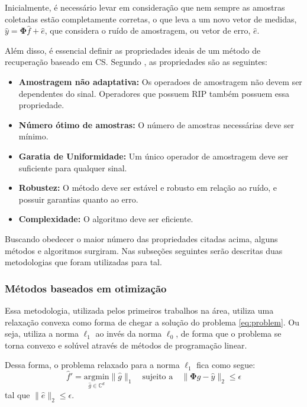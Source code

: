 \documentclass[cic,tc]{iiufrgs}
\begin{document}
Inicialmente, é necessário levar em consideração que nem sempre as amostras coletadas estão completamente corretas,
o que leva a um novo vetor de medidas, $\hat{y} = \mathbf{\Phi} \hat{f} + \hat{e}$, que considera o ruído de amostragem, 
ou vetor de erro, $\hat{e}$.

Além disso, é essencial definir as propriedades ideais de um método de recuperação
baseado em CS. Segundo \citet{chen2015compressed}, as propriedades são as seguintes:
\begin{itemize}
    \item \textbf{Amostragem não adaptativa:} Os operadoes de amostragem não devem ser dependentes do sinal. 
          Operadores que possuem RIP também possuem essa propriedade.
    \item \textbf{Número ótimo de amostras:} O número de amostras necessárias deve ser mínimo.
    \item \textbf{Garatia de Uniformidade:} Um único operador de amostragem deve ser suficiente para qualquer sinal.
    \item \textbf{Robustez:} O método deve ser estável e robusto em relação ao ruído, e possuir garantias 
          quanto ao erro.
    \item \textbf{Complexidade:} O algoritmo deve ser eficiente.
\end{itemize}

Buscando obedecer o maior número das propriedades citadas acima, alguns métodos e algoritmos surgiram. 
Nas subseções seguintes serão descritas duas metodologias que foram utilizadas para tal.

\subsubsection{Métodos baseados em otimização}
Essa metodologia, utilizada pelos primeiros trabalhos na área, utiliza uma relaxação convexa como forma
de chegar a solução do problema \eqref{eq:problem}. Ou seja, utiliza a norma $\ell_1$ ao invés da norma $\ell_0$,
de forma que o problema se torna convexo e solúvel através de métodos de programação linear.

Dessa forma, o problema relaxado para a norma $\ell_1$ fica como segue:
\begin{equation}
    \label{eq:probleml1}
    \hat{f}' = \underset{\hat{g} \in \mathbb{C}^d}{\text{argmin}} \lVert \hat{g} \rVert_1 \hspace{1em} \text{sujeito a} \hspace{1em}
    \lVert \mathbf{\Phi} \hat{g} - \hat{y} \rVert_2 \le \epsilon
\end{equation}
tal que $\lVert \hat{e} \rVert_2 \le \epsilon $.
\end{document}
